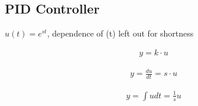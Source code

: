 \subsection{PID Controller}
        $u(t) = e^{st}$, dependence of (t) left out for shortness\\
        \begin{minipage}{0.28\linewidth}
            \begin{align*}
                y = k \cdot u
            \end{align*}
        \end{minipage}
        \begin{minipage}{0.32\linewidth}
            \begin{align*}
                y = \frac{du}{dt} = s \cdot u
            \end{align*}
        \end{minipage}
        \begin{minipage}{0.32\linewidth}
            \begin{align*}
                y = \int u dt = \frac{1}{s} u
            \end{align*}
        \end{minipage}
        
    
